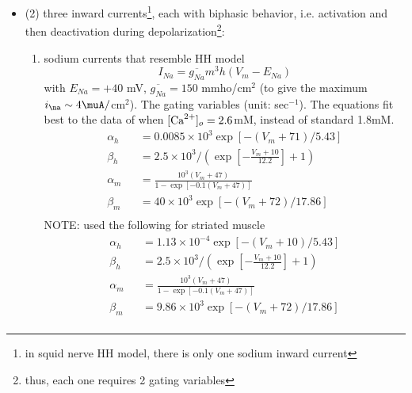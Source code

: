 \begin{itemize}
\item (2) three inward
  currents\footnote{in squid nerve HH model, there is only one sodium
    inward current},
  each with biphasic behavior, i.e. activation and then deactivation
  during
  depolarization\footnote{thus, each one requires 2 gating variables}:
  \begin{enumerate}
  \item sodium currents that resemble HH model
    \begin{equation}
      \label{eq:608}
      I_{Na} = \overline{g_{Na}}m^3h(V_m-E_{Na})
    \end{equation}
    with $E_{Na}=+40$ mV, $\overline{g_{Na}}=150$ mmho/cm$^2$ (to give the
    maximum $i_\na \sim 4\muA/$cm$^2$).  The gating variables (unit:
    sec$^{-1}$). The equations fit best to the data of \citep{noble1962mhh} when
    $[{\text{Ca}^{2+}}]_o=2.6$mM, instead of standard 1.8mM. 
\begin{eqnarray}
  \alpha_h &&= 0.0085 \times 10^3 \exp [-(V_m+71)/5.43] \\
  \beta_h &&= 2.5\times 10^3/(\exp[-\frac{V_m + 10}{12.2}] + 1) \\
  \alpha_m &&= \frac{10^3(V_m+47)}{1-\exp[-0.1(V_m+47)]} \\
  \beta_m &&= 40\times 10^3 \exp\left[ -(V_m+72)/17.86 \right] \\
\end{eqnarray}
NOTE: \citep{adrian1970} used the following for striated muscle     
\begin{eqnarray}
  \alpha_h &&= 1.13\times 10^{-4} \exp [-(V_m+10)/5.43] \\
  \beta_h &&= 2.5\times 10^3/(\exp[-\frac{V_m + 10}{12.2}] + 1) \\
  \alpha_m &&= \frac{10^3(V_m+47)}{1-\exp[-0.1(V_m+47)]} \\
  \beta_m &&= 9.86\times 10^3 \exp\left[ -(V_m+72)/17.86 \right] \\
\end{eqnarray}


\end{enumerate}
\end{itemize}

